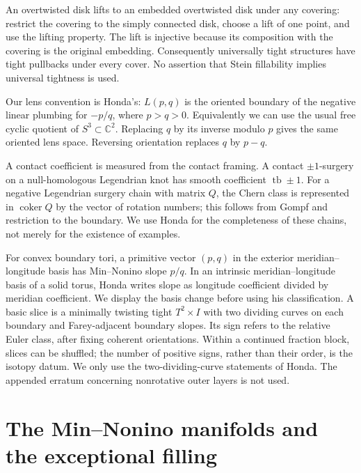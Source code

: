 \documentclass[12pt]{amsart}
\theoremstyle{definition}
\theoremstyle{remark}
\numberwithin{equation}{section}
\newcommand{\C}{\mathbb{C}}
\theoremstyle{definition}
\begin{document}
An overtwisted disk lifts to an embedded overtwisted disk under any covering: restrict the covering to the simply connected disk, choose a lift of one point, and use the lifting property. The lift is injective because its composition with the covering is the original embedding. Consequently universally tight structures have tight pullbacks under every cover. No assertion that Stein fillability implies universal tightness is used.

Our lens convention is Honda's: $L(p,q)$ is the oriented boundary of the negative linear plumbing for $-p/q$, where $p>q>0$. Equivalently we can use the usual free cyclic quotient of $S^3\subset\C^2$. Replacing $q$ by its inverse modulo $p$ gives the same oriented lens space. Reversing orientation replaces $q$ by $p-q$.

A contact coefficient is measured from the contact framing. A contact $\pm1$-surgery on a null-homologous Legendrian knot has smooth coefficient $\operatorname{tb}\pm1$. For a negative Legendrian surgery chain with matrix $Q$, the Chern class is represented in $\operatorname{coker}Q$ by the vector of rotation numbers; this follows from Gompf \cite[Proposition 2.3]{en-Gompf} and restriction to the boundary. We use Honda \cite[Theorem 2.1 and Section 4.6.2]{en-Honda} for the completeness of these chains, not merely for the existence of examples.

For convex boundary tori, a primitive vector $(p,q)$ in the exterior meridian--longitude basis has Min--Nonino slope $p/q$. In an intrinsic meridian--longitude basis of a solid torus, Honda writes slope as longitude coefficient divided by meridian coefficient. We display the basis change before using his classification. A basic slice is a minimally twisting tight $T^2\times I$ with two dividing curves on each boundary and Farey-adjacent boundary slopes. Its sign refers to the relative Euler class, after fixing coherent orientations. Within a continued fraction block, slices can be shuffled; the number of positive signs, rather than their order, is the isotopy datum. We only use the two-dividing-curve statements of Honda. The appended erratum concerning nonrotative outer layers is not used.

\section{The Min--Nonino manifolds and the exceptional filling}\label{en-manifold}
\end{document}
